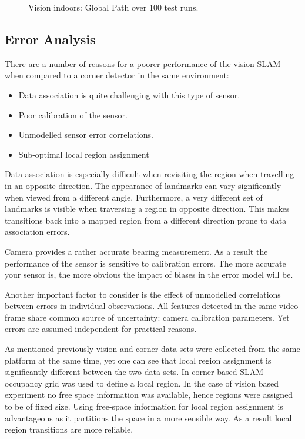 \begin{figure}[htbp]
  \centering
  \caption{Vision indoors: Global Path over 100 test runs.}
  \label{fig:edge_odo_all}
\end{figure}



\subsection{Error Analysis}

There are a number of reasons for a poorer performance of the vision
SLAM when compared to a corner detector in the same environment:

\begin{itemize}
\item Data association is quite challenging with this type of
sensor. 
\item Poor calibration of the sensor.
\item Unmodelled sensor error correlations.
\item Sub-optimal local region assignment
\end{itemize}

Data association is especially difficult when revisiting the region
when travelling in an opposite direction. The appearance of landmarks
can vary significantly when viewed from a different
angle. Furthermore, a very different set of landmarks is visible when
traversing a region in opposite direction. This makes transitions back
into a mapped region from a different direction prone to data
association errors.

Camera provides a rather accurate bearing measurement. As a result the
performance of the sensor is sensitive to calibration errors. The more
accurate your sensor is, the more obvious the impact of biases in the
error model will be.

Another important factor to consider is the effect of unmodelled
correlations between errors in individual observations. All features
detected in the same video frame share common source of uncertainty:
camera calibration parameters. Yet errors are assumed independent for
practical reasons.

As mentioned previously vision and corner data sets were collected
from the same platform at the same time, yet one can see that local
region assignment is significantly different between the two data
sets. In corner based SLAM occupancy grid was used to define a local
region. In the case of vision based experiment no free space
information was available, hence regions were assigned to be of fixed
size. Using free-space information for local region assignment is
advantageous as it partitions the space in a more sensible way. As a
result local region transitions are more reliable.


